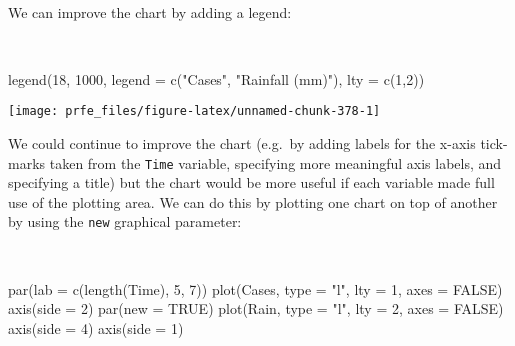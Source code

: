 \documentclass[
  12pt,
  a4paper]{book}
\newenvironment{Shaded}{\begin{snugshade}}{\end{snugshade}}
\newcommand{\AttributeTok}[1]{\textcolor[rgb]{0.77,0.63,0.00}{#1}}
\newcommand{\ConstantTok}[1]{\textcolor[rgb]{0.00,0.00,0.00}{#1}}
\newcommand{\DecValTok}[1]{\textcolor[rgb]{0.00,0.00,0.81}{#1}}
\newcommand{\FunctionTok}[1]{\textcolor[rgb]{0.00,0.00,0.00}{#1}}
\newcommand{\NormalTok}[1]{#1}
\newcommand{\StringTok}[1]{\textcolor[rgb]{0.31,0.60,0.02}{#1}}
\begin{document}
~

We can improve the chart by adding a legend:

~

\begin{Shaded}
\begin{Highlighting}[]
\FunctionTok{legend}\NormalTok{(}\DecValTok{18}\NormalTok{, }\DecValTok{1000}\NormalTok{, }\AttributeTok{legend =} \FunctionTok{c}\NormalTok{(}\StringTok{"Cases"}\NormalTok{, }\StringTok{"Rainfall (mm)"}\NormalTok{), }\AttributeTok{lty =} \FunctionTok{c}\NormalTok{(}\DecValTok{1}\NormalTok{,}\DecValTok{2}\NormalTok{))}
\end{Highlighting}
\end{Shaded}

\begin{center}\texttt{[image: prfe\_files/figure-latex/unnamed-chunk-378-1]} \end{center}

\newpage

We could continue to improve the chart (e.g.~by adding labels for the x-axis tick-marks taken from the \texttt{Time} variable, specifying more meaningful axis labels, and specifying a title) but the chart would be more useful if each variable made full use of the plotting area. We can do this by plotting one chart on top of another by using the \texttt{new} graphical parameter:

~

\begin{Shaded}
\begin{Highlighting}[]
\FunctionTok{par}\NormalTok{(}\AttributeTok{lab =} \FunctionTok{c}\NormalTok{(}\FunctionTok{length}\NormalTok{(Time), }\DecValTok{5}\NormalTok{, }\DecValTok{7}\NormalTok{))}
\FunctionTok{plot}\NormalTok{(Cases, }\AttributeTok{type =} \StringTok{"l"}\NormalTok{, }\AttributeTok{lty =} \DecValTok{1}\NormalTok{, }\AttributeTok{axes =} \ConstantTok{FALSE}\NormalTok{)}
\FunctionTok{axis}\NormalTok{(}\AttributeTok{side =} \DecValTok{2}\NormalTok{)}
\FunctionTok{par}\NormalTok{(}\AttributeTok{new =} \ConstantTok{TRUE}\NormalTok{)}
\FunctionTok{plot}\NormalTok{(Rain, }\AttributeTok{type =} \StringTok{"l"}\NormalTok{, }\AttributeTok{lty =} \DecValTok{2}\NormalTok{, }\AttributeTok{axes =} \ConstantTok{FALSE}\NormalTok{)}
\FunctionTok{axis}\NormalTok{(}\AttributeTok{side =} \DecValTok{4}\NormalTok{)}
\FunctionTok{axis}\NormalTok{(}\AttributeTok{side =} \DecValTok{1}\NormalTok{)}
\end{Highlighting}
\end{Shaded}
\end{document}
